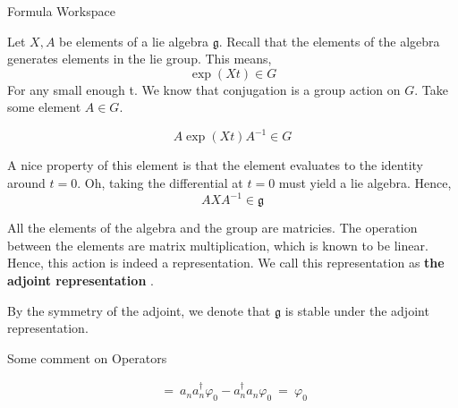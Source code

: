\documentclass{article}
\begin{document}
\begin{center}
\LARGE
Formula Workspace

\normalsize
\end{center}

Let $X, A$ be elements of a lie algebra $\mathfrak g$. 
Recall that the elements of the algebra generates elements 
in the lie group. This means, 
\[
    \exp(Xt) \in G
\]
For any small enough t. We know that conjugation is a group 
action on $G$. Take some element $A \in G$. 

\[
    A \exp(Xt) A^{-1} \in G
\]

A nice property of this element is that the element 
evaluates to the identity around $t = 0$. Oh, taking 
the differential at $t=0$ must yield a lie algebra. Hence, 
\[
    A X A^{-1} \in \mathfrak g
\]

All the elements of the algebra and the group are matricies. 
The operation between the elements are matrix multiplication, 
which is known to be linear. Hence, this action is indeed 
a representation. We call this representation as \textbf{
    the adjoint representation
}. 

By the symmetry of the adjoint, we denote that 
$\mathfrak g$ is stable under the adjoint representation. 


Some comment on Operators 

\begin{align}
    [a_n, a_n^\dag] \ = \ a_n a_n ^\dag \varphi_0 - a_n^\dag a_n \varphi_0  \ = \ \varphi_0
\end{align}
\end{document}
